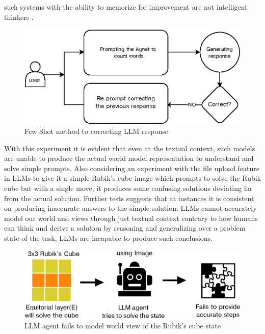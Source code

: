 \documentclass[pdflatex,sn-mathphys-num]{sn-jnl}%
\theoremstyle{thmstyleone}%
\theoremstyle{thmstyletwo}%
\theoremstyle{thmstylethree}%
\begin{document}
such systems with the ability to memorize for improvement are not intelligent thinkers \cite{wei2024memorizationdeeplearningsurvey}. 

\begin{figure}[H]
    \centering
    \includegraphics[scale=0.80]{figures/fig1.eps}
    \captionsetup{justification=centering}
    \vspace{0.5cm}
    \caption{Few Shot method to correcting LLM response}
\end{figure}
With this experiment it is evident that even at the textual context, such models are unable to produce the actual world model representation to understand and solve simple prompts. Also considering an experiment with the file upload feature in LLMs to give it a simple Rubik's cube image which prompts to solve the Rubik cube but with a single move, it produces some confusing solutions deviating far from the actual solution. Further tests suggests that at instances it is consistent on producing inaccurate answers to the simple solution. LLMs cannot accurately model our world and views through just textual context\cite{BLANK2023987} contrary to how humans can think and derive a solution by reasoning and generalizing over a problem state of the task, LLMs are incapable to produce such conclusions.

\begin{figure}[H]
    \centering
    \includegraphics[scale=0.50]{figures/drawing.eps}
    \captionsetup{justification=centering}
    \vspace{0.5cm}
    \caption{LLM agent fails to model world view of the Rubik's cube state}
    \label{fig:IndirectPromptingA}
\end{figure}
\end{document}
